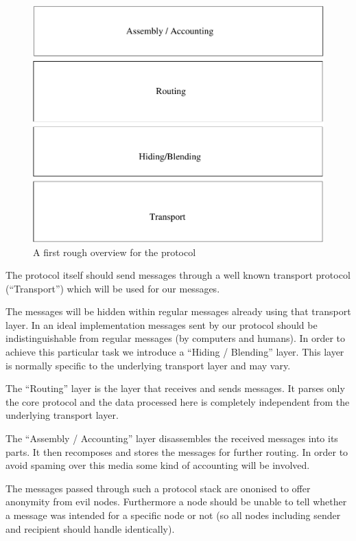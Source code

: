 \begin{figure}[h]
	\includegraphics[width=\columnwidth]{inc/roughProtocolDesign.pdf}
	\caption{A first rough overview for the protocol}
	\label{fig:roughProtocolDesign}
\end{figure}	

The protocol itself should send messages through a well known transport protocol (``Transport'') which will be used for our messages. 

The messages will be hidden within regular messages already using that transport layer. In an ideal implementation messages sent by our protocol should be indistinguishable from regular messages (by computers and humans). In order to achieve this particular task we introduce a ``Hiding / Blending'' layer. This layer is normally specific to the underlying transport layer and may vary.

The ``Routing'' layer is the layer that receives and sends messages. It parses only the core protocol and the data processed here is completely independent from the underlying transport layer.

The ``Assembly / Accounting'' layer disassembles the received messages into its parts. It then recomposes and stores the messages for further routing. In order to avoid spaming over this media some kind of accounting will be involved. 

The messages passed through such a protocol stack are ononised to offer anonymity from evil nodes. Furthermore a node should be unable to tell whether a message was intended for a specific node or not (so all nodes including sender and recipient should handle identically).

